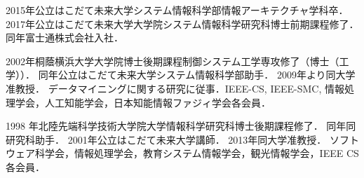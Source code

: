 \documentclass{compsoft}
\begin{document}
\begin{choshashoukai}


{2015年公立はこだて未来大学システム情報科学部情報アーキテクチャ学科卒．
2017年公立はこだて未来大学大学院システム情報科学研究科博士前期課程修了．
同年富士通株式会社入社．
}

{2002年桐蔭横浜大学大学院博士後期課程制御システム工学専攻修了（博士（工学））．
同年公立はこだて未来大学システム情報科学部助手．
2009年より同大学准教授．
データマイニングに関する研究に従事．IEEE-CS, IEEE-SMC, 情報処理学会，人工知能学会，日本知能情報ファジィ学会各会員．}

{1998 年北陸先端科学技術大学院大学情報科学研究科博士後期課程修了．
同年同研究科助手．
2001年公立はこだて未来大学講師．
2013年同大学准教授．
ソフトウェア科学会，情報処理学会，教育システム情報学会，観光情報学会，IEEE CS 各会員．}

\end{choshashoukai}
\end{document}
